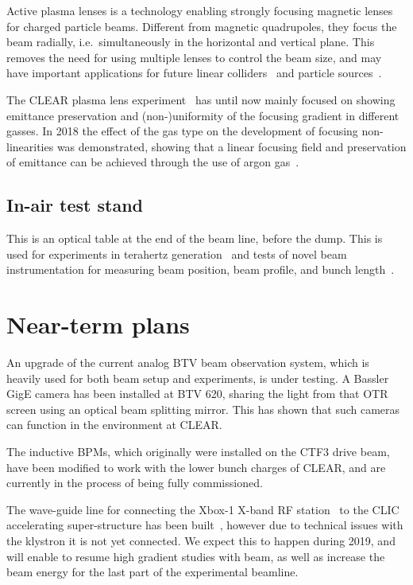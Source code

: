 \documentclass[a4paper,
               keeplastbox,   %
               ]{jacow}
\begin{document}
Active plasma lenses is a technology enabling strongly focusing magnetic lenses for charged particle beams.
Different from magnetic quadrupoles, they focus the beam radially, i.e.\ simultaneously in the horizontal and vertical plane.
This removes the need for using multiple lenses to control the beam size, and may have important applications for future linear colliders~\cite{CarlApochromatic} and particle sources~\cite{Braun1}.

The CLEAR plasma lens experiment~\cite{CLEAR-PLE,Erik::CLEARrev} has until now mainly focused on showing emittance preservation and (non-)uniformity of the focusing gradient in different gasses.
In 2018 the effect of the gas type on the development of focusing non-linearities was demonstrated, showing that a linear focusing field and preservation of emittance can be achieved through the use of argon gas~\cite{CarlPRL}.

\subsection{In-air test stand}
This is an optical table at the end of the beam line, before the dump.
This is used for experiments in terahertz generation~\cite{CurcioPRAB} and tests of novel beam instrumentation for measuring beam position, beam profile, and bunch length~\cite{Thibaut::CLEARrev}.

\section{Near-term plans}

An upgrade of the current analog BTV beam observation system, which is heavily used for both beam setup and experiments, is under testing.
A Bassler GigE camera has been installed at BTV 620, sharing the light from that OTR screen using an optical beam splitting mirror.
This has shown that such cameras can function in the environment at CLEAR.

The inductive BPMs, which originally were installed on the CTF3 drive beam, have been modified to work with the lower bunch charges of CLEAR, and are currently in the process of being fully commissioned.

The wave-guide line for connecting the Xbox-1 X-band RF station~\cite{Xbox1,Xboxen} to the CLIC accelerating super-structure has been built~\cite{Pitman:IPAC19-WEPRB063}, however due to technical issues with the klystron it is not yet connected.
We expect this to happen during 2019, and will enable to resume high gradient studies with beam, as well as increase the beam energy for the last part of the experimental beamline.
\end{document}
